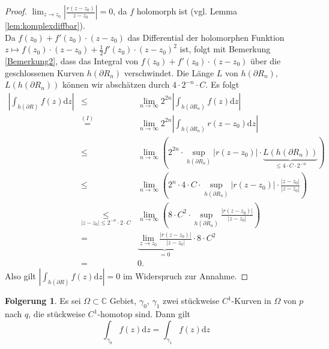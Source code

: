 \documentclass[11pt,titlepage]{article}
\theoremstyle{definition}
\newtheorem{corollary}[theorem]{Folgerung}
\theoremstyle{remark}
\begin{document}
\begin{proof}
		$\lim_{z\to z_0} |\frac{r(z-z_0)}{z-z_0}|=0$, da $f$ holomorph ist 
		(vgl. Lemma \ref{lem:komplexdiffbar}).\\
		Da $f(z_0)+f'(z_0)\cdot (z-z_0)$ das Differential der holomorphen Funktion
		$z\mapsto f(z_0)\cdot (z-z_0)+\frac{1}{2}f'(z_0)\cdot (z-z_0)^2$ ist, folgt mit Bemerkung 
		\ref{Bemerkung2}, dass 
		das Integral von $f(z_0)+f'(z_0)\cdot (z-z_0)$ über die geschlossenen Kurven $h(\partial R_n)$ 
		verschwindet. Die Länge $L$ von $h(\partial R_n)$, $L(h(\partial R_n))$ können wir abschätzen 
		durch $4\cdot 2^{-n}\cdot C$. Es folgt
		\begin{eqnarray*}
			\left| \int_{h(\partial R)}f(z)\mathrm{d}z \right| 
			&\leq& \lim_{n\to\infty} 2^{2n} \left| \int_{h(\partial R_n)}f(z)\mathrm{d}z \right| \\
			&\overset{(I)}{=}& \lim_{n\to\infty} 2^{2n} \left|\int_{h(\partial R_n)}
			r(z-z_0)\mathrm{d}z \right| \\
			&\leq& \lim_{n\to\infty} \left( 2^{2n} \cdot \sup_{h(\partial R_n)}|r(z-z_0)|\cdot 
			\underbrace{L(h(\partial R_n))}_{\leq 4\cdot C\cdot 
			2^{-n}}\right) \\
			&\leq& \lim_{n\to\infty} \left(2^n \cdot 4\cdot C \cdot \sup_{h(\partial R_n)} |r(z-z_0)| \cdot 
			\frac{|z-z_0|}{|z-z_0|}\right) \\
			&\underset{|z-z_0|\leq 2^{-n}\cdot 2\cdot C}{\leq}& \lim_{n\to\infty} \left(8\cdot C^2 \cdot
			\sup_{h(\partial R_n)} \frac{|r(z-z_0)|}{|z-z_0|}\right) \\
			&=& \underbrace{\lim_{z\to z_0} \frac{|r(z-z_0)|}{|z-z_0|}}_{=0}\cdot 8\cdot C^2 \\
			&=&0.
		\end{eqnarray*}
		Also gilt $| \int_{h(\partial R)}f(z)\mathrm{d}z |=0$ im Widerspruch zur Annahme.
	\end{proof}
	
	\begin{corollary}\label{coroll:homotop}
		Es sei $\Omega\subset\mathbb{C}$ Gebiet, $\gamma_0$, $\gamma_1$ zwei stückweise 
		$C^1$-Kurven in $\Omega$ von $p$ nach $q$, die stückweise $C^1$-homotop sind. 
		Dann gilt
		\[ \int_{\gamma_0} f(z)\mathrm{d}z=\int_{\gamma_1}f(z)\mathrm{d}z \]
	\end{corollary}
	
\end{document}

